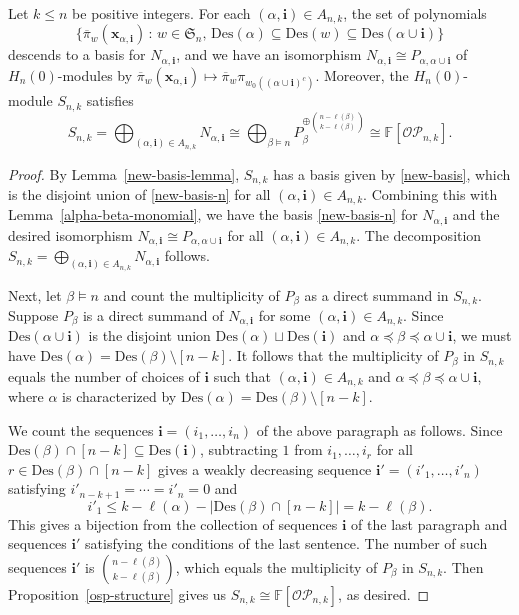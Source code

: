 \documentclass[ALCO,ThmDefs,published]{cedram}
\newcommand{\symm}{{\mathfrak{S}}}
\newcommand{\xx}{{\mathbf {x}}}
\newcommand{\FF}{{\mathbb{F}}}
\theoremstyle{plain}
\newcommand{\Des}{{\mathrm {Des}}}
\newcommand{\symm}{{\mathfrak{S}}}
\newcommand{\OP}{{\mathcal{OP}}}
\newcommand{\FF}{{\mathbb{F}}}
\newcommand{\xx}{{\mathbf {x}}}
\newcommand{\ii}{{\mathbf{i}}}
\newcommand{\pib}{\overline{\pi}}
\begin{document}
\begin{theorem}
\label{s-decomposition-theorem}
Let $k \leq n$ be positive integers. 
For each $(\alpha,\ii) \in A_{n,k}$, the set of polynomials 
\begin{equation}
\label{new-basis-n}
\{ \pib_w(\xx_{\alpha,\ii}) \,:\, w \in \symm_n, \, \Des(\alpha) \subseteq \Des(w) 
\subseteq \Des(\alpha \cup \ii) \}
\end{equation}
descends to a basis for $N_{\alpha,\ii}$, and we have an isomorphism $N_{\alpha,\ii} \cong P_{\alpha,\alpha \cup \ii}$ of $H_n(0)$-modules by $\pib_w(\xx_{\alpha,\ii}) \mapsto \pib_w\pi_{w_0((\alpha\cup\ii)^c)}$.
Moreover, the $H_n(0)$-module $S_{n,k}$ satisfies
\begin{equation}
S_{n,k} = \bigoplus_{(\alpha,\ii) \in A_{n,k}} N_{\alpha,\ii} 
\cong \bigoplus_{\beta \models n} P_{\beta}^{\oplus{n - \ell(\beta) \choose k - \ell(\beta)}} \cong \FF[\OP_{n,k}].
\end{equation}
\end{theorem}

\begin{proof}
By Lemma~\ref{new-basis-lemma}, $S_{n,k}$ has a basis given by \eqref{new-basis}, which is the disjoint union of \eqref{new-basis-n} for all $(\alpha, \ii) \in A_{n,k}$.
Combining this with Lemma~\ref{alpha-beta-monomial}, we have the basis \eqref{new-basis-n} for $N_{\alpha,\ii}$ and the desired isomorphism $N_{\alpha,\ii} \cong P_{\alpha,\alpha\cup\ii}$ for all $(\alpha, \ii) \in A_{n,k}$.
The decomposition $S_{n,k} = \bigoplus_{(\alpha,\ii) \in A_{n,k}} N_{\alpha,\ii}$ follows.

Next, let $\beta\models n$ and count the multiplicity of $P_{\beta}$ as a direct summand in $S_{n,k}$.
Suppose $P_{\beta}$ is a direct summand of $N_{\alpha,\ii}$ for some $(\alpha,\ii) \in A_{n,k}$.
Since $\Des(\alpha \cup \ii)$ is the disjoint union $\Des(\alpha) \sqcup \Des(\ii)$ and
$\alpha \preceq \beta \preceq \alpha \cup \ii$, we must have $\Des(\alpha) = \Des(\beta) \setminus [n-k]$.
It follows that the multiplicity of $P_{\beta}$ in $S_{n,k}$ equals the number of 
choices of $\ii$ such that $(\alpha,\ii) \in A_{n,k}$ and
$\alpha \preceq \beta \preceq \alpha \cup \ii$, where $\alpha$ is characterized by
$\Des(\alpha) = \Des(\beta) \setminus [n-k]$.

We count the sequences $\ii = (i_1, \dots, i_n)$ of the above paragraph as follows.
Since $\Des(\beta) \cap [n-k] \subseteq \Des(\ii)$,  subtracting $1$ from $i_1, \dots, i_r$ for all
$r \in \Des(\beta) \cap [n-k]$ gives a weakly decreasing sequence $\ii' = (i'_1, \dots, i'_n)$ satisfying
$i'_{n-k+1} = \cdots = i'_n = 0$ and
\begin{equation*}
i'_1 \leq k - \ell(\alpha) - |\Des(\beta) \cap [n-k]| = k - \ell(\beta).
\end{equation*}
This gives a bijection from the collection of sequences $\ii$ of the last paragraph and 
sequences $\ii'$ satisfying the conditions of the last sentence.    
The number of such sequences $\ii'$ is ${n - \ell(\beta) \choose k - \ell(\beta)}$, which equals the multiplicity of $P_\beta$ in $S_{n,k}$.
Then Proposition~\ref{osp-structure} gives us $S_{n,k} \cong \FF[\OP_{n,k}]$, as desired.
\end{proof}
\end{document}
